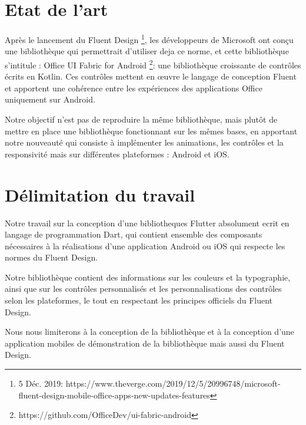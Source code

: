 \documentclass[a4paper,12pt]{report}
\begin{document}
            \section*{Etat de l’art}

                Après le lancement du Fluent Design \footnote{5 Déc. 2019: https://www.theverge.com/2019/12/5/20996748/microsoft-fluent-design-mobile-office-apps-new-updates-features}, les développeurs de Microsoft ont conçu 
                une bibliothèque qui permettrait d’utiliser deja ce norme, 
                et cette bibliothèque s’intitule : Office UI Fabric for Android \footnote{https://github.com/OfficeDev/ui-fabric-android}: 
                une bibliothèque croissante de contrôles écrits en Kotlin. 
                Ces contrôles mettent en œuvre le langage de conception Fluent et apportent une 
                cohérence entre les expériences des applications Office uniquement sur Android.
                
                
                Notre objectif n’est pas de reproduire la même bibliothèque, 
                mais plutôt de mettre en place une bibliothèque fonctionnant sur les mêmes bases, 
                en apportant notre nouveauté qui consiste à implémenter les animations, les contrôles 
                et la responsivité mais sur différentes plateformes : Android et iOS.
            
            \section*{Délimitation du travail}
                Notre travail sur la conception d’une bibliotheques Flutter absolument 
                ecrit en langage de programmation Dart, qui contient ensemble des 
                composants nécessaires à la réalisations d’une application Android ou iOS 
                qui respecte les normes du Fluent Design.

                Notre bibliothèque contient des informations sur les couleurs et la 
                typographie, ainsi que sur les contrôles personnalisés et les personnalisations 
                des contrôles selon les plateformes, le tout  en respectant les principes 
                officiels du  Fluent Design.
            
                Nous nous limiterons à la conception de la bibliothèque et à la conception 
                d’une application mobiles de démonstration de la bibliothèque mais aussi 
                du Fluent Design.
            
                
                
                
\end{document}
